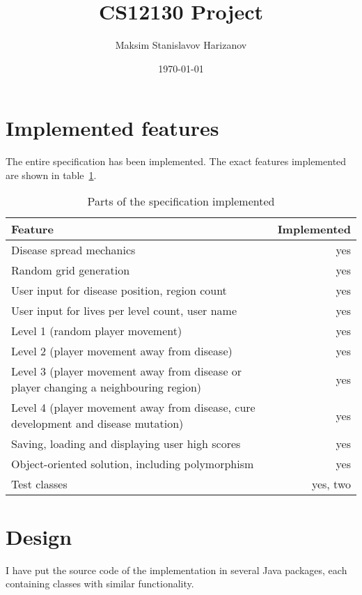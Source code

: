 \documentclass[a4paper]{article}
\title{CS12130 Project}
\author{Maksim Stanislavov Harizanov}
\date{\today}
\begin{document}
\maketitle

\section{Implemented features}
	The entire specification has been implemented. The exact features implemented are shown in table~\ref{tab:specs}.
	\begin{table}
	\begin{tabular}{lr}
		\toprule
	    	Feature & Implemented \\
		\hline
		Disease spread mechanics & yes \\
		Random grid generation & yes \\
		User input for disease position, region count & yes \\
		User input for lives per level count, user name & yes \\
		Level 1 (random player movement) & yes \\
		Level 2 (player movement away from disease) & yes \\
		Level 3 (player movement away from disease or player changing a neighbouring region) & yes \\
		Level 4 (player movement away from disease, cure development and disease mutation) & yes \\
		Saving, loading and displaying user high scores & yes \\
		Object-oriented solution, including polymorphism & yes \\
		Test classes & yes, two \\
		\bottomrule
	\end{tabular}
	\caption{Parts of the specification implemented}
	\label{tab:specs}
	\end{table}
	
\section{Design}
	I have put the source code of the implementation in several Java packages, each containing classes with similar functionality.
	
\end{document}
